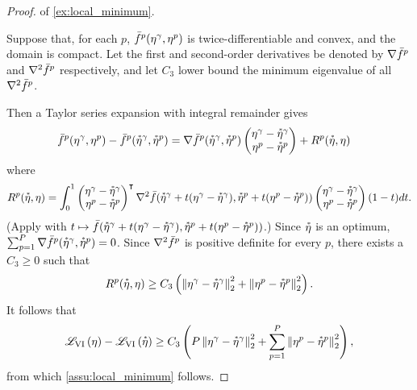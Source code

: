 \begin{proof} of \cref{ex:local_minimum}.

Suppose that, for each $p$, $\bar{f}^p(\eta^\gamma, \eta^p)$ is
twice-differentiable and convex, and the domain is compact.  Let the first and
second-order derivatives be denoted by $\nabla \bar{f}^p$ and $\nabla^2 \bar{f}^p$
respectively, and let $C_3$ lower bound the minimum eigenvalue of all
$\nabla^2 \bar{f}^p$.


Then a Taylor series expansion with integral remainder gives
%
\begin{align*}
%
\fbar^p(\eta^\gamma, \eta^p) - \fbar^p(\etastar^\gamma, \etastar^p) ={}&
\nabla \fbar^p(\etastar^\gamma, \etastar^p)
\begin{pmatrix}
    \eta^\gamma - \etastar^\gamma \\
    \eta^p - \etastar^p
\end{pmatrix}
%
+ R^p(\etastar, \eta)
%
\end{align*}
%
where
%
\begin{align*}
%
R^p(\etastar, \eta) =
\int_0^1
\begin{pmatrix}
    \eta^\gamma - \etastar^\gamma \\
    \eta^p - \etastar^p
\end{pmatrix}^\trans
\nabla^2 \fbar(\etastar^\gamma + t (\eta^\gamma - \etastar^\gamma),
               \etastar^p + t (\eta^p - \etastar^p))
\begin{pmatrix}
    \eta^\gamma - \etastar^\gamma \\
    \eta^p - \etastar^p
\end{pmatrix}
(1-t) dt.
%
\end{align*}
%
(Apply \citet[Theorem B.2]{dudley:2018:real} with $t \mapsto
\bar{f}(\accentset{*}{\eta}^\gamma + t (\eta^\gamma - \accentset{*}{\eta}^\gamma), \accentset{*}{\eta}^p + t
(\eta^p - \accentset{*}{\eta}^p))$.)  Since $\accentset{*}{\eta}$ is an optimum,
$\sum_{p=1}^{P} \nabla \bar{f}^p(\accentset{*}{\eta}^\gamma, \accentset{*}{\eta}^p) = 0$.  Since
$\nabla^2 \bar{f}^p$ is positive definite
for every $p$, there exists a $C_3 \ge 0$ such that
%
\begin{align*}
%
R^p(\etastar, \eta) \ge
    C_3 \left(\norm{\eta^\gamma - \etastar^\gamma}_2^2 +
              \norm{\eta^p - \etastar^p}_2^2 \right).
%
\end{align*}
%
It follows that
%
\begin{align*}
%
\klfullobj{\eta} - \klfullobj{\etastar} \ge
    C_3 \left( P  \norm{\eta^\gamma - \etastar^\gamma}_2^2 +
    \sump \norm{\eta^p - \etastar^p}_2^2
    \right),
%
\end{align*}
%
from which \cref{assu:local_minimum} follows.

\end{proof}
